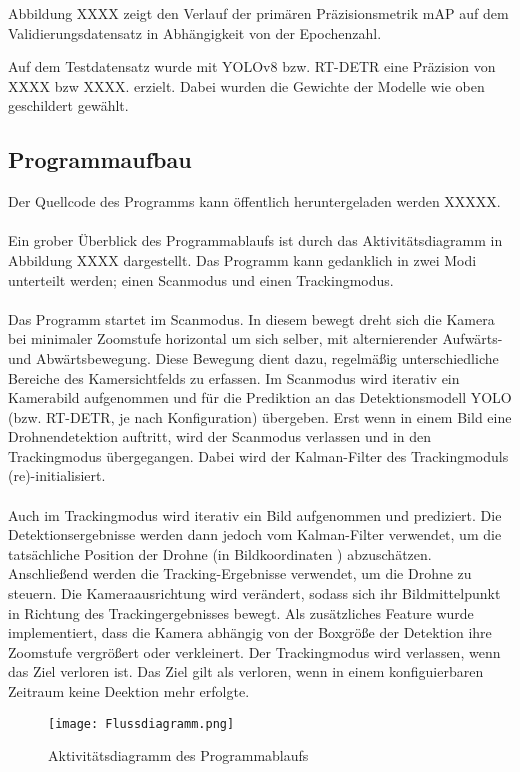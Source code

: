 \documentclass[runningheads]{llncs}
\begin{document}
Abbildung XXXX zeigt den Verlauf der primären Präzisionsmetrik mAP auf dem Validierungsdatensatz in Abhängigkeit von der Epochenzahl.

Auf dem Testdatensatz wurde mit YOLOv8 bzw. RT-DETR eine Präzision von XXXX bzw XXXX. erzielt. Dabei wurden die Gewichte der Modelle wie oben geschildert gewählt.

\subsection{Programmaufbau}

Der Quellcode des Programms kann öffentlich heruntergeladen werden XXXXX.\\\\

Ein grober Überblick des Programmablaufs ist durch das Aktivitätsdiagramm in Abbildung XXXX dargestellt. Das Programm kann gedanklich in zwei Modi unterteilt werden; einen Scanmodus und einen Trackingmodus.\\\\ Das Programm startet im Scanmodus. In diesem bewegt dreht sich die Kamera bei minimaler Zoomstufe horizontal um sich selber, mit alternierender Aufwärts- und Abwärtsbewegung. Diese Bewegung dient dazu, regelmäßig unterschiedliche Bereiche des Kamersichtfelds zu erfassen. Im Scanmodus wird iterativ ein Kamerabild aufgenommen und für die Prediktion an das Detektionsmodell YOLO (bzw. RT-DETR, je nach Konfiguration) übergeben. Erst wenn in einem Bild eine Drohnendetektion auftritt, wird der Scanmodus verlassen und in den Trackingmodus übergegangen. Dabei wird der Kalman-Filter des Trackingmoduls (re)-initialisiert.\\\\
Auch im Trackingmodus wird iterativ ein Bild aufgenommen und prediziert. Die Detektionsergebnisse werden dann jedoch vom Kalman-Filter verwendet, um die tatsächliche Position der Drohne (in Bildkoordinaten ) abzuschätzen. Anschließend werden die Tracking-Ergebnisse verwendet, um die Drohne zu steuern. Die Kameraausrichtung wird verändert, sodass sich ihr Bildmittelpunkt in Richtung des Trackingergebnisses bewegt. Als zusätzliches Feature wurde implementiert, dass die Kamera abhängig von der Boxgröße der Detektion ihre Zoomstufe vergrößert oder verkleinert. Der Trackingmodus wird verlassen, wenn das Ziel verloren ist. Das Ziel gilt als verloren, wenn in einem konfiguierbaren Zeitraum keine Deektion mehr erfolgte.


\begin{figure}
    \centering
    \texttt{[image: Flussdiagramm.png]}
    \caption{Aktivitätsdiagramm des Programmablaufs}
\end{figure}
\FloatBarrier
\end{document}
